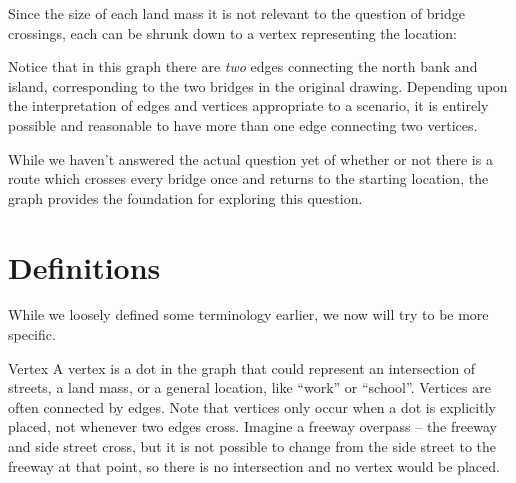 \begin{example}{}
\begin{center}
\end{center}
Since the size of each land mass it is not relevant to the question of bridge crossings, each can be shrunk down to a vertex representing the location:
\begin{center}
\par{}\label{fig:graphtheory-dor1-tikz04}%

\end{center}

Notice that in this graph there are \textit{two} edges connecting the north bank and island, corresponding to the two bridges in the original drawing.  Depending upon the interpretation of edges and vertices appropriate to a scenario, it is entirely possible and reasonable to have more than one edge connecting two vertices.

While we haven't answered the actual question yet of whether or not there is a route which crosses every bridge once and returns to the starting location, the graph provides the foundation for exploring this question.
 \end{example}

\section{Definitions}
While we loosely defined some terminology earlier, we now will try to be more specific.

\begin{definition}{Vertex}\label{def:vertex} 
A vertex is a dot in the graph that could represent an intersection of streets, a land mass, or a general location, like ``work'' or ``school''.  Vertices are often connected by edges.  Note that vertices only occur when a dot is explicitly placed, not whenever two edges cross.  Imagine a freeway overpass -- the freeway and side street cross, but it is not possible to change from the side street to the freeway at that point, so there is no intersection and no vertex would be placed.
\end{definition}

